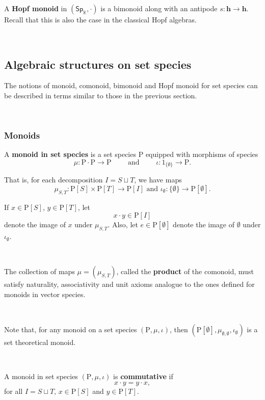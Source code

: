 \documentclass[12pt, reqno]{amsart}
\theoremstyle{definition}
\newcommand{\Ssk}{\mathsf{Sp}_\Kb} %
\newcommand{\Kb}{\mathbb{K}}
\newcommand{\rP}{\mathrm{P}}
\newcommand{\thh}{\mathbf{h}}
\begin{document}
A {\bf Hopf monoid} in $(\Ssk, \cdot)$ is a bimonoid along with an antipode $s:\thh \to \thh $.
Recall that this is also the case in the classical Hopf algebras.

\

\subsection{Algebraic structures on set species}

The notions of monoid, comonoid, bimonoid and Hopf monoid for set species can be described in terms similar to those in the previous section. 

\

\subsubsection{Monoids}
A {\bf monoid in set species} is a set species $\rP$ equipped with morphisms of species
\begin{equation}
    \mu: \rP \cdot \rP \to \rP \qquad \text{ and } \qquad \iota: \mathrm{1}_{\{\emptyset \} } \to \rP.
\end{equation}

That is, for each decomposition $I=S \sqcup T$, we have maps 
\begin{equation}
    \mu_{S,T}: \rP[S] \times \rP[T]\to \rP[I] \text{ and } \iota_\emptyset: \{\emptyset\} \to \rP[\emptyset].
\end{equation}

If $x \in \rP[S]$, $y \in \rP[T]$,  let 
\[x \cdot y \in \rP[I]\]
denote the image of $x$ under $\mu_{S,T}$. Also, let $e\in \rP[\emptyset]$ denote the image of $\emptyset$ under $\iota_\emptyset$.

\

The collection of maps $\mu=(\mu_{S,T})$, called the {\bf product} of the comonoid, must satisfy naturality, associativity and unit axioms analogue to the ones defined for monoids in vector species.

\

Note that, for any monoid on a set species $(\rP, \mu, \iota)$, then $(\rP[\emptyset], \mu_{\emptyset, \emptyset}, \iota_\emptyset)$ is a set theoretical monoid.

\

A monoid in set species $(\rP, \mu, \iota)$ is {\bf commutative} if
\[x\cdot y=y\cdot x,\]
for all $I=S \sqcup T$, $x \in \rP[S]$ and $y \in \rP[T]$.

\
\end{document}
